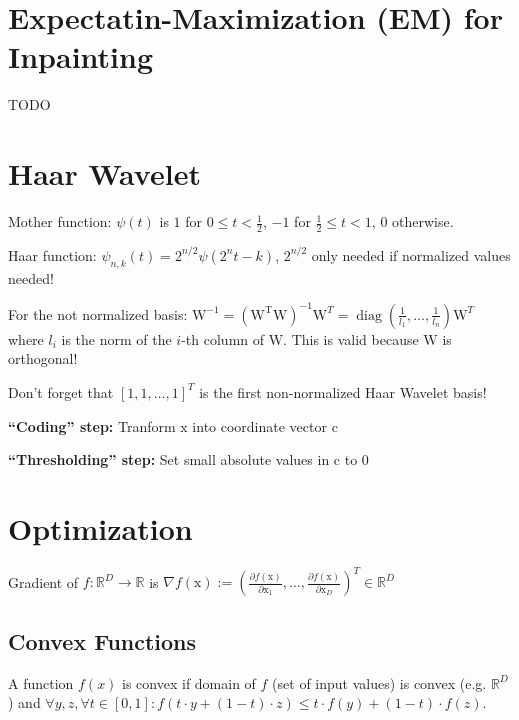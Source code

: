 \documentclass[a4paper, 11pt, landscape]{article}
\newcommand{\matr}[1]{\boldsymbol{\mathrm{#1}}}
\begin{document}
\begin{multicols*}{3}
\section{Expectatin-Maximization (EM) for Inpainting}
TODO

\section{Haar Wavelet}
\begin{compactdesc}
	\item[Mother function:] $\psi(t)$ is $1$ for $0 \leq t < \frac{1}{2}$, $-1$ for $\frac{1}{2} \leq t < 1$, $0$ otherwise.
	\item[Haar function:] $\psi_{n,k}(t) = 2^{n/2} \psi(2^n t - k)$, $2^{n/2}$ only needed if normalized values needed!
\end{compactdesc}

\begin{compactitem}
	\item For the not normalized basis: $\matr{W}^{-1} = (\matr{W^T} \matr{W})^{-1} \matr{W}^T = \operatorname{diag}(\frac{1}{l_1}, \ldots, \frac{1}{l_n}) \matr{W}^T$ where $l_i$ is the norm of the $i$-th column of $\matr{W}$. This is valid because $\matr{W}$ is orthogonal!
	\item Don't forget that $[1, 1, \ldots, 1]^T$ is the first non-normalized Haar Wavelet basis!
	\item \textbf{``Coding'' step:} Tranform $\matr{x}$ into coordinate vector $\matr{c}$
	\item \textbf{``Thresholding'' step:} Set small absolute values in $\matr{c}$ to $0$
\end{compactitem}

\section{Optimization}
Gradient of $f: \mathbb{R}^D \to \mathbb{R}$ is $\nabla f(\matr{x}) := \left( \frac{\partial f(\matr{x})}{\partial \matr{x}_1}, \ldots, \frac{\partial f(\matr{x})}{\partial \matr{x}_D} \right)^T \in \mathbb{R}^D$

\subsection{Convex Functions}
A function $f(x)$ is convex if domain of $f$ (set of input values) is convex (e.g. $\mathbb{R}^D$) and $\forall y, z, \forall t \in [0, 1]: f(t \cdot y + (1-t) \cdot z) \leq t \cdot f(y) + (1-t) \cdot f(z)$.


\end{multicols*}
\end{document}
